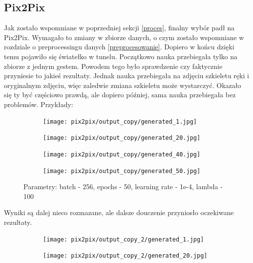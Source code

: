 \documentclass[12pt]{article}
\begin{document}
\begin{sloppypar}
{  \subsection{Pix2Pix}
  {
    Jak zostało wspomniane w poprzedniej sekcji \ref{proces}, finalny wybór padł na Pix2Pix. 
    Wymagało to zmiany w zbiorze danych, o czym zostało wspomniane w rozdziale o preprocessingu danych \ref{preprocesowanie}. 
    Dopiero w końcu dzięki temu pojawiło się światełko w tunelu. Początkowo nauka przebiegała tylko na zbiorze z jednym gestem. 
    Powodem tego było sprawdzenie czy faktycznie przyniesie to jakieś rezultaty. 
    Jednak nauka przebiegała na zdjęciu szkieletu ręki i oryginalnym zdjęciu, więc zaledwie zmiana szkieletu może wystarczyć. 
    Okazało się ty być częściowo prawdą, ale dopiero później, sama nauka przebiegała bez problemów.
    Przykłady:
    \begin{figure}[H]
      \begin{subfigure}{.5\textwidth}
        \centering
        \texttt{[image: pix2pix/output\_copy/generated\_1.jpg]}
      \end{subfigure}%
      \begin{subfigure}{.5\textwidth}
        \centering
        \texttt{[image: pix2pix/output\_copy/generated\_20.jpg]}
      \end{subfigure}
      \begin{subfigure}{.5\textwidth}
        \centering
        \texttt{[image: pix2pix/output\_copy/generated\_40.jpg]}
      \end{subfigure}
      \begin{subfigure}{.5\textwidth}
        \centering
        \texttt{[image: pix2pix/output\_copy/generated\_50.jpg]}
      \end{subfigure}
      \caption{Parametry: batch - 256, epochs - 50, learning rate - 1e-4, lambda - 100}
    \end{figure}
    Wyniki są dalej nieco rozmazane, ale dalsze douczenie przyniosło oczekiwane rezultaty.
    \begin{figure}[H]
      \begin{subfigure}{.5\textwidth}
        \centering
        \texttt{[image: pix2pix/output\_copy\_2/generated\_1.jpg]}
      \end{subfigure}%
      \begin{subfigure}{.5\textwidth}
        \centering
        \texttt{[image: pix2pix/output\_copy\_2/generated\_20.jpg]}
      \end{subfigure}
      \begin{subfigure}{.5\textwidth}

\end{subfigure}
\end{figure}}}
\end{sloppypar}
\end{document}
